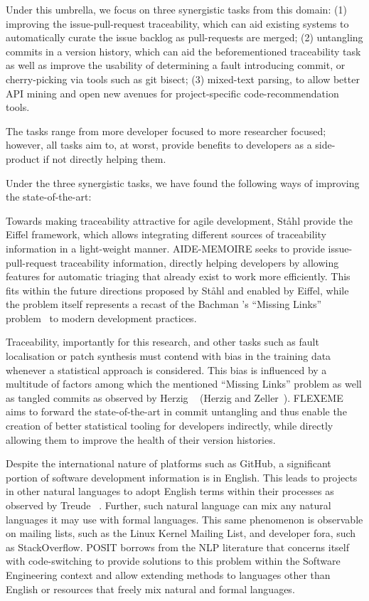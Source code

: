 Under this umbrella, we focus on three synergistic tasks from this domain: (1)
improving the issue-pull-request traceability, which can aid existing systems to
automatically curate the issue backlog as pull-requests are merged; (2)
untangling commits in a version history, which can aid the beforementioned
traceability task as well as improve the usability of determining a fault
introducing commit, or cherry-picking via tools such as git bisect; (3)
mixed-text parsing, to allow better API mining and open new avenues for
project-specific code-recommendation tools. 

The tasks range from more developer focused to more researcher focused; however,
all tasks aim to, at worst, provide benefits to developers as a side-product if
not directly helping them.

Under the three synergistic tasks, we have found the following ways of improving
the state-of-the-art:

Towards making traceability attractive for agile development, Ståhl \etal [2]
provide the Eiffel framework, which allows integrating different sources of
traceability information in a light-weight manner. AIDE-MEMOIRE seeks to provide
issue-pull-request traceability information, directly helping developers by
allowing features for automatic triaging that already exist to work more
efficiently. This fits within the future directions proposed by Ståhl \etal and
enabled by Eiffel, while the problem itself represents a recast of the Bachman
\etal’s “Missing Links” problem~\cite{MissingLinks} to modern development
practices. 

Traceability, importantly for this research, and other tasks such as fault
localisation or patch synthesis must contend with bias in the training data
whenever a statistical approach is considered. This bias is influenced by a
multitude of factors among which the mentioned “Missing Links” problem as well
as tangled commits as observed by Herzig \etal~\cite{Herzig2016} (Herzig and
Zeller~\cite{Herzig2013}). FLEXEME aims to forward the state-of-the-art in
commit untangling and thus enable the creation of better statistical tooling for
developers indirectly, while directly allowing them to improve the health of
their version histories. 

Despite the international nature of platforms such as GitHub, a significant
portion of software development information is in English. This leads to
projects in other natural languages to adopt English terms within their
processes as observed by Treude \etal~\cite{Treude2015portuguese}. Further, such
natural language can mix any natural languages it may use with formal languages.
This same phenomenon is observable on mailing lists, such as the Linux Kernel
Mailing List, and developer fora, such as StackOverflow. POSIT borrows from the
NLP literature that concerns itself with code-switching to provide solutions to
this problem within the Software Engineering context and allow extending methods
to languages other than English or resources that freely mix natural and formal
languages.


